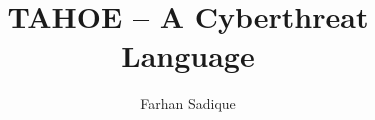 \documentclass[10pt]{article}
\title{ \textbf{TAHOE -- A Cyberthreat Language} }
\author{Farhan Sadique}
\begin{document}
\sloppy

\maketitle

\tableofcontents

\pagebreak






%    



\end{document}
